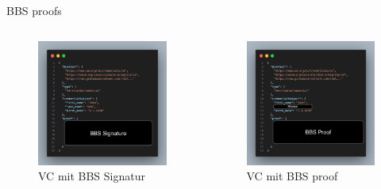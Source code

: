 \documentclass[
	german,%
	authorontitle=true,
	]{bfhbeamer}
\begin{document}
\begin{frame}{BBS proofs}
    \begin{columns}[onlytextwidth,T]
        \column{70mm}  
        \begin{figure}
            \centering
            \includegraphics[width=60mm]{../img/VCSignBlock.png}
            \caption{VC mit BBS Signatur}
        \end{figure}

        \column{70mm}

        \begin{figure}
            \centering
            \includegraphics[width=60mm]{../img/VCProofBlock.png}
            \caption{VC mit BBS proof}
        \end{figure}

    \end{columns}
\end{frame}
\end{document}
